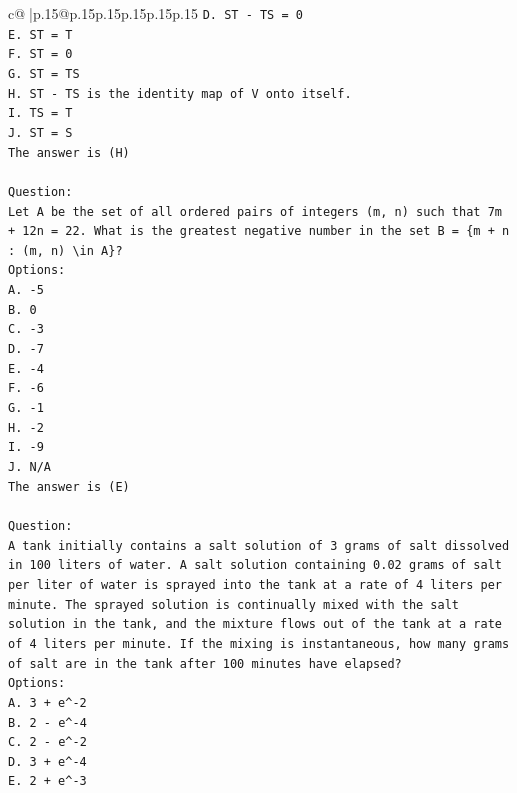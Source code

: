 \documentclass{article}
\begin{document}
{\begin{supertabular}{c@{$\;$}|p{.15\linewidth}@{}p{.15\linewidth}p{.15\linewidth}p{.15\linewidth}p{.15\linewidth}p{.15\linewidth}}
{{{\texttt{D. ST {-} TS = 0} \\
\texttt{E. ST = T} \\
\texttt{F. ST = 0} \\
\texttt{G. ST = TS} \\
\texttt{H. ST {-} TS is the identity map of V onto itself.} \\
\texttt{I. TS = T} \\
\texttt{J. ST = S} \\
\texttt{The answer is (H)} \\
\\ 
\texttt{Question:} \\
\texttt{Let A be the set of all ordered pairs of integers (m, n) such that 7m + 12n = 22. What is the greatest negative number in the set B = \{m + n : (m, n) \textbackslash{}in A\}?} \\
\texttt{Options:} \\
\texttt{A. {-}5} \\
\texttt{B. 0} \\
\texttt{C. {-}3} \\
\texttt{D. {-}7} \\
\texttt{E. {-}4} \\
\texttt{F. {-}6} \\
\texttt{G. {-}1} \\
\texttt{H. {-}2} \\
\texttt{I. {-}9} \\
\texttt{J. N/A} \\
\texttt{The answer is (E)} \\
\\ 
\texttt{Question:} \\
\texttt{A tank initially contains a salt solution of 3 grams of salt dissolved in 100 liters of water. A salt solution containing 0.02 grams of salt per liter of water is sprayed into the tank at a rate of 4 liters per minute. The sprayed solution is continually mixed with the salt solution in the tank, and the mixture flows out of the tank at a rate of 4 liters per minute. If the mixing is instantaneous, how many grams of salt are in the tank after 100 minutes have elapsed?} \\
\texttt{Options:} \\
\texttt{A. 3 + e\^{}{-}2} \\
\texttt{B. 2 {-} e\^{}{-}4} \\
\texttt{C. 2 {-} e\^{}{-}2} \\
\texttt{D. 3 + e\^{}{-}4} \\
\texttt{E. 2 + e\^{}{-}3} \\
}}}
\end{supertabular}}
\end{document}
